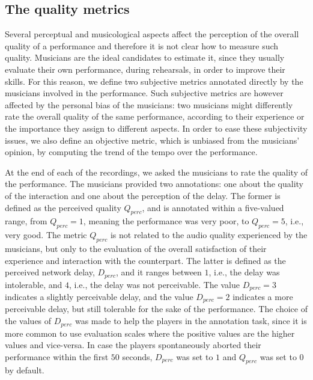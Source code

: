 \subsection{The quality metrics}\label{sec:NMP:codomain}
Several perceptual and musicological aspects affect the perception of the overall quality of a performance and therefore it is not clear how to measure such quality. Musicians are the ideal candidates to estimate it, since they usually evaluate their own performance, during rehearsals, in order to improve their skills. For this reason, we define two subjective metrics annotated directly by the musicians involved in the performance. Such subjective metrics are however affected by the personal bias of the musicians: two musicians might differently rate the overall quality of the same performance, according to their experience or the importance they assign to different aspects. In order to ease these subjectivity issues, we also define an objective metric, which is unbiased from the musicians' opinion, by computing the trend of the tempo over the performance.

At the end of each of the recordings, we asked the musicians to rate the quality of the performance. The musicians provided two annotations: one about the quality of the interaction and one about the perception of the delay. The former is defined as the perceived quality $Q_{perc}$, and is annotated within a five-valued range, from $Q_{perc}=1$, meaning the performance was very poor, to $Q_{perc}=5$, i.e., very good. The metric $Q_{perc}$ is not related to the audio quality experienced by the musicians, but only to the evaluation of the overall satisfaction of their experience and interaction with the counterpart. The latter is defined as the perceived network delay, $D_{perc}$, and it ranges between $1$, i.e., the delay was intolerable, and $4$, i.e., the delay was not perceivable. The value $D_{perc}=3$ indicates a slightly perceivable delay, and the value $D_{perc}=2$ indicates a more perceivable delay, but still tolerable for the sake of the performance. The choice of the values of $D_{perc}$ was made to help the players in the annotation task, since it is more common to use evaluation scales where the positive values are the higher values and vice-versa. In case the players spontaneously aborted their performance within the first $50$ seconds, $D_{perc}$ was set to $1$ and $Q_{perc}$ was set to $0$ by default. 

